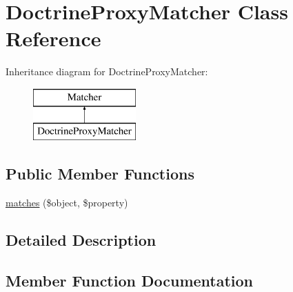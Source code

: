 \hypertarget{class_deep_copy_1_1_matcher_1_1_doctrine_1_1_doctrine_proxy_matcher}{}\section{Doctrine\+Proxy\+Matcher Class Reference}
\label{class_deep_copy_1_1_matcher_1_1_doctrine_1_1_doctrine_proxy_matcher}
Inheritance diagram for Doctrine\+Proxy\+Matcher\+:\begin{figure}[H]
\begin{center}
\leavevmode
\includegraphics[height=2.000000cm]{class_deep_copy_1_1_matcher_1_1_doctrine_1_1_doctrine_proxy_matcher}
\end{center}
\end{figure}
\subsection*{Public Member Functions}
\begin{DoxyCompactItemize}
\item 
\mbox{\hyperlink{class_deep_copy_1_1_matcher_1_1_doctrine_1_1_doctrine_proxy_matcher_a2e9fdbe8d1a508d5c5ee7c81d27d77ea}{matches}} (\$object, \$property)
\end{DoxyCompactItemize}


\subsection{Detailed Description}


\subsection{Member Function Documentation}
\mbox{\label{class_deep_copy_1_1_matcher_1_1_doctrine_1_1_doctrine_proxy_matcher_a2e9fdbe8d1a508d5c5ee7c81d27d77ea}} 

